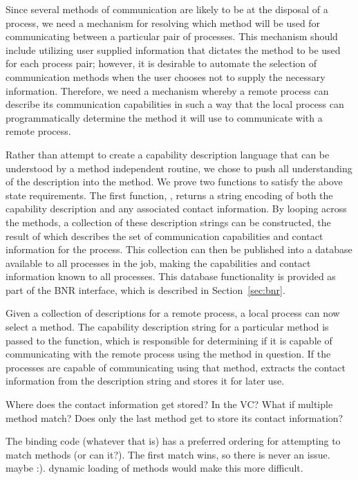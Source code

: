 Since several methods of communication are likely to be at the disposal of a
process, we need a mechanism for resolving which method will be used for
communicating between a particular pair of processes.  This mechanism should
include utilizing user supplied information that dictates the method to be used
for each process pair; however, it is desirable to automate the selection of
communication methods when the user chooses not to supply the necessary
information.  Therefore, we need a mechanism whereby a remote process can
describe its communication capabilities in such a way that the local process
can programmatically determine the method it will use to communicate with a
remote process.

Rather than attempt to create a capability description language that can be
understood by a method independent routine, we chose to push all understanding
of the description into the method.  We prove two functions to satisfy the
above state requirements.  The first function, ,
returns a string encoding of both the capability description and any associated
contact information.  By looping across the methods, a collection of these
description strings can be constructed, the result of which describes the set
of communication capabilities and contact information for the process.  This
collection can then be published into a database available to all processes in
the job, making the capabilities and contact information known to all
processes.  This database functionality is provided as part of the BNR
interface, which is described in Section~\ref{sec:bnr}.

Given a collection of descriptions for a remote process, a local process can
now select a method.  The capability description string for a particular method
is passed to the  function, which is
responsible for determining if it is capable of communicating with the remote
process using the method in question.  If the processes are capable of
communicating using that method,  extracts the contact
information from the description string and stores it for later use.


\begin{cmt}[BRT]
  Where does the contact information get stored?  In the VC?  What if multiple
  method match?  Does only the last method get to store its contact
  information?
\end{cmt}

\begin{cmt}[ROB]
  The binding code (whatever that is) has a preferred ordering for attempting
  to match methods (or can it?).  The first match wins, so there is never an
  issue.  maybe :).  dynamic loading of methods would make this more difficult.
\end{cmt}

